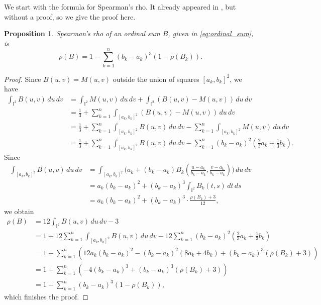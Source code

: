 \documentclass[12pt,a4paper]{amsart}
\newtheorem{proposition}[theorem]{Proposition}
\theoremstyle{definition}
\newcommand{\II}{\mathbb{I}}
\begin{document}
We start with the formula for Spearman's rho. It already appeared in \cite{KoBuSt2}, but without a proof, so we give the proof here. 

\begin{proposition}\label{prop:ordinal-rho}
   Spearman's rho of an ordinal sum $B$, given in \eqref{eq:ordinal_sum}, is
    \begin{equation} \label{eq:ordinal-rho}
        \rho(B) =  1 - \sum_{k=1}^n (b_k-a_k)^3(1-\rho(B_k)). 
    \end{equation}  
\end{proposition}

\begin{proof} Since $B(u,v) = M(u,v)$ outside the union of squares $[a_k, b_k]^2$, we have
\begin{align*}
\int_{\II^2} B(u,v) \, du\, dv &= \int_{\II^2} M(u,v) \, du\, dv + \int_{\II^2} (B(u,v)-M(u,v)) \, du \, dv\\
    &= \tfrac13 + \sum_{k=1}^n  \int_{[a_k, b_k]^2} (B(u,v)-M(u,v)) \, du\, dv \\
    &= \tfrac13 + \sum_{k=1}^n  \int_{[a_k, b_k]^2} B(u,v) \, du\, dv - \sum_{k=1}^n  \int_{[a_k, b_k]^2} M(u,v) \, du \, dv \\
    &= \tfrac13 + \sum_{k=1}^n  \int_{[a_k, b_k]^2} B(u,v) \, du\, dv - \sum_{k=1}^n (b_k-a_k)^2 (\tfrac23 a_k+ \tfrac13 b_k).
\end{align*}
Since
\begin{align*}
\int_{[a_k, b_k]^2} B(u, v) \, du \, dv &= \int_{[a_k, b_k]^2} \big(a_k + (b_k-a_k)B_k(\tfrac{u-a_k}{b_k-a_k},\tfrac{v-a_k}{b_k-a_k})\big) \, du \, dv \\ 
&= a_k(b_k-a_k)^2 + (b_k-a_k)^3\int_{\II^2}B_k(t,s) \, dt \, ds \\ 
&= a_k(b_k-a_k)^2 + (b_k-a_k)^3\cdot\frac{\rho(B_k)+3}{12},
\end{align*}
we obtain
\begin{align*}
\rho(B) &= 12\int_{\II^2} B(u,v) \, du \, dv -3\\  
&= 1 + 12\sum_{k=1}^n  \int_{[a_k, b_k]^2} B(u,v) \, du \, dv - 12\sum_{k=1}^n (b_k-a_k)^2 (\tfrac23 a_k+ \tfrac13 b_k) \\ 
&= 1 + \sum_{k=1}^n \left(12a_k(b_k-a_k)^2 -(b_k-a_k)^2 (8 a_k+ 4 b_k) + (b_k-a_k)^3(\rho(B_k)+3) \right) \\ 
&= 1 + \sum_{k=1}^n \left(-4(b_k-a_k)^3 + (b_k-a_k)^3(\rho(B_k)+3) \right) \\ 
&= 1 - \sum_{k=1}^n  (b_k-a_k)^3(1-\rho(B_k)),   
\end{align*}
which finishes the proof.
\end{proof}
\end{document}
